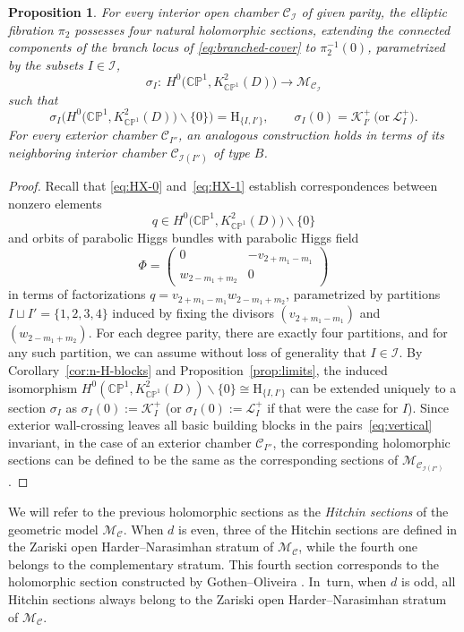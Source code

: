 \documentclass[pdftex]{sigma}
\newcommand{\field}[1]{\ensuremath{\mathbb{#1}}}
\newcommand{\CC}{\field{C}}
\newcommand{\PP}{\field{P}}
\newcommand{\curly}[1]{\mathscr{#1}}
\newcommand{\cK}{\curly{K}}
\newcommand{\cL}{\curly{L}}
\newcommand{\cM}{\curly{M}}
\newcommand{\qC}{\mathcal{C}}
\newcommand{\qI}{\mathcal{I}}
\numberwithin{equation}{section}
\newtheorem{Proposition}[Theorem]{Proposition}
 { \theoremstyle{definition}
\newtheorem{Definition}[Theorem]{Definition}
\newtheorem{Note}[Theorem]{Note}
\newtheorem{Example}[Theorem]{Example}
\newtheorem{Remark}[Theorem]{Remark} }
\begin{document}
\begin{Proposition}\label{prop:Hitchin-s}
For every interior open chamber $\qC_{\qI}$ of given parity, the elliptic fibration $\pi_{2}$ possesses four natural holomorphic sections, extending the connected components of the branch locus of \eqref{eq:branched-cover} to $\pi^{-1}_{2}(0)$, parametrized by the subsets $I\in \qI$,
\[
\sigma_{I}\colon\ H^{0}\bigl(\CC\PP^{1},K^{2}_{\CC\PP^{1}}(D)\bigr)\rightarrow \cM_{\qC_{\qI}}
\]
such that
\[
\sigma_{I}\bigl(H^{0}\bigl(\CC\PP^{1},K^{2}_{\CC\PP^{1}}(D)\bigr)\backslash \{0\}\bigr) = \mathrm{H}_{\{I,I'\}},\qquad \sigma_{I}(0) = \cK^{+}_{I'}\ \big(\text{or}\ \cL^{+}_{I}\big).
\]
For every exterior chamber $\qC_{I''}$, an analogous construction holds in terms of its neighboring interior chamber $\qC_{\qI(I'')}$ of type $B$.
\end{Proposition}

\begin{proof}
Recall that \eqref{eq:HX-0} and~\eqref{eq:HX-1} establish correspondences between nonzero elements
\[
q\in H^{0}\bigl(\CC\PP^{1},K^{2}_{\CC\PP^{1}}(D)\bigr)\backslash\{0\}
\]
and orbits of parabolic Higgs bundles with parabolic Higgs field
\[
\Phi = \begin{pmatrix}
0 & -v_{2+m_{1}-m_{1}}\\
w_{2-m_{1}+m_{2}} & 0
\end{pmatrix}
\]
in terms of factorizations $q = v_{2+m_{1}-m_{1}}w_{2-m_{1}+m_{2}}$, parametrized by partitions $I\sqcup I' = \{1,2,3,4\}$ induced by fixing the divisors $(v_{2+m_{1}-m_{1}})$ and $(w_{2-m_{1}+m_{2}})$. For each degree parity, there are exactly four partitions, and for any such partition, we can assume without loss of generality that \mbox{$I\in \qI$}. By Corollary~\ref{cor:n-H-blocks} and Proposition~\ref{prop:limits}, the induced isomorphism $H^{0}(\CC\PP^{1},K^{2}_{\CC\PP^{1}}(D))\backslash\{0\}\allowbreak\cong\mathrm{H}_{\{I,I'\}}$ can be extended uniquely to a section $\sigma_{I}$ as $\sigma_{I}(0):= \cK^{+}_{I}$ (or $\sigma_{I}(0):= \cL^{+}_{I}$ if that were the case for $I$). Since exterior wall-crossing leaves all basic building blocks in the pairs~\eqref{eq:vertical} invariant, in the case of an exterior chamber $\qC_{I''}$, the corresponding holomorphic sections can be defined to be the same as the corresponding sections of $\cM_{\qC_{\qI(I'')}}$.
\end{proof}

We will refer to the previous holomorphic sections as the \textit{Hitchin sections} of the geometric model $\cM_{\qC}$. When $d$ is even, three of the Hitchin sections are defined in the Zariski open Harder--Narasimhan stratum of $\cM_{\qC}$, while the fourth one belongs to the complementary stratum. This fourth section corresponds to the holomorphic section constructed by Gothen--Oliveira \cite{GO19}. In~turn, when $d$ is odd, all Hitchin sections always belong to the Zariski open Harder--Narasimhan stratum of $\cM_{\qC}$.
\end{document}
